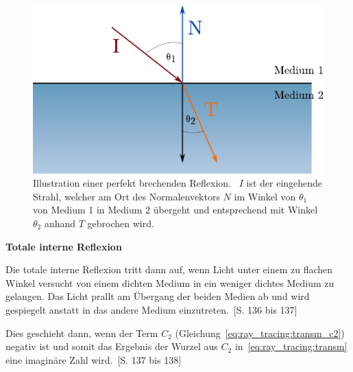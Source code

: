 \begin{figure}[H]\label{fig:ray_tracing_specular_transmission}
    \centering
    \includegraphics{img/perfect_specular_tranmission.pdf}
    \caption{Illustration einer perfekt brechenden
        Reflexion.~\protect\footnotemark{}
        $I$ ist der eingehende Strahl, welcher am Ort des
        Normalenvektors $N$ im Winkel von $\theta_{1}$ von Medium 1 in
        Medium 2 übergeht und entsprechend mit Winkel $\theta_{2}$
        anhand $T$ gebrochen wird.}
\end{figure}

\textbf{Totale interne Reflexion}

Die totale interne Reflexion tritt dann auf, wenn Licht unter einem zu
flachen Winkel versucht von einem dichten Medium in ein weniger dichtes
Medium zu gelangen. Das Licht prallt am Übergang der beiden Medien ab
und wird gespiegelt anstatt in das andere Medium
einzutreten.~\cite{glassner_introduction_1989}[S. 136 bis 137]

Dies geschieht dann, wenn der Term $C_{2}$
(Gleichung~\ref{eq:ray_tracing:transm_c2}) negativ ist und somit das
Ergebnis der Wurzel aus $C_{2}$ in~\ref{eq:ray_tracing:transm} eine
imaginäre Zahl wird.~\cite{glassner_introduction_1989}[S. 137 bis 138]

